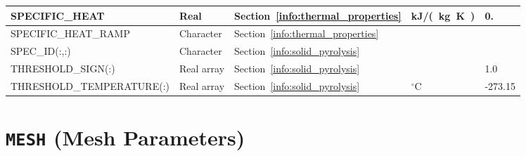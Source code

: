 \documentclass[11pt]{book}
\begin{document}
\begin{longtable}{@{\extracolsep{\fill}}|l|l|l|l|l|}
{\ct SPECIFIC\_HEAT}                & Real          & Section~\ref{info:thermal_properties} & \si{kJ/(kg.K)}    & 0.     \\ \hline
{\ct SPECIFIC\_HEAT\_RAMP}          & Character     & Section~\ref{info:thermal_properties} &                   &        \\ \hline
{\ct SPEC\_ID(:,:)}                 & Character     & Section~\ref{info:solid_pyrolysis}    &                   &        \\ \hline
{\ct THRESHOLD\_SIGN(:)}            & Real array    & Section~\ref{info:solid_pyrolysis}    &                   & 1.0    \\ \hline
{\ct THRESHOLD\_TEMPERATURE(:)}     & Real array    & Section~\ref{info:solid_pyrolysis}    & $^\circ$C         & -273.15 \\ \hline
\end{longtable}

\vspace{\baselineskip}



\section{\texorpdfstring{{\tt MESH}}{MESH} (Mesh Parameters)}
\end{document}
